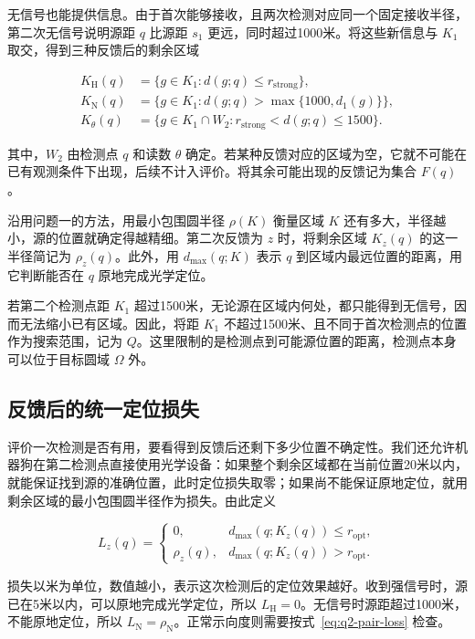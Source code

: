 无信号也能提供信息。由于首次能够接收，且两次检测对应同一个固定接收半径，第二次无信号说明源距 \(q\) 比源距 \(s_1\) 更远，同时超过1000米。将这些新信息与 \(K_1\) 取交，得到三种反馈后的剩余区域

\begin{equation}
\begin{aligned}
K_{\mathrm H}(q)&=\{g\in K_1:d(g;q)\le r_{\mathrm{strong}}\},\\
K_{\mathrm N}(q)&=\{g\in K_1:d(g;q)>\max\{1000,d_1(g)\}\},\\
K_\theta(q)&=\{g\in K_1\cap W_2:r_{\mathrm{strong}}<d(g;q)\le1500\}.
\end{aligned}
\label{eq:q2-pair-regions}
\end{equation}

其中，\(W_2\) 由检测点 \(q\) 和读数 \(\theta\) 确定。若某种反馈对应的区域为空，它就不可能在已有观测条件下出现，后续不计入评价。将其余可能出现的反馈记为集合 \(F(q)\)。

沿用问题一的方法，用最小包围圆半径 \(\rho(K)\) 衡量区域 \(K\) 还有多大，半径越小，源的位置就确定得越精细。第二次反馈为 \(z\) 时，将剩余区域 \(K_z(q)\) 的这一半径简记为 \(\rho_z(q)\)。此外，用 \(d_{\max}(q;K)\) 表示 \(q\) 到区域内最远位置的距离，用它判断能否在 \(q\) 原地完成光学定位。

若第二个检测点距 \(K_1\) 超过1500米，无论源在区域内何处，都只能得到无信号，因而无法缩小已有区域。因此，将距 \(K_1\) 不超过1500米、且不同于首次检测点的位置作为搜索范围，记为 \(Q\)。这里限制的是检测点到可能源位置的距离，检测点本身可以位于目标圆域 \(\Omega\) 外。

\subsection{反馈后的统一定位损失}

评价一次检测是否有用，要看得到反馈后还剩下多少位置不确定性。我们还允许机器狗在第二检测点直接使用光学设备：如果整个剩余区域都在当前位置20米以内，就能保证找到源的准确位置，此时定位损失取零；如果尚不能保证原地定位，就用剩余区域的最小包围圆半径作为损失。由此定义

\begin{equation}
 L_z(q)=
 \begin{cases}
 0,&d_{\max}(q;K_z(q))\le r_{\mathrm{opt}},\\
 \rho_z(q),&d_{\max}(q;K_z(q))>r_{\mathrm{opt}}.
 \end{cases}
\label{eq:q2-pair-loss}
\end{equation}

损失以米为单位，数值越小，表示这次检测后的定位效果越好。收到强信号时，源已在5米以内，可以原地完成光学定位，所以 \(L_{\mathrm H}=0\)。无信号时源距超过1000米，不能原地定位，所以 \(L_{\mathrm N}=\rho_{\mathrm N}\)。正常示向度则需要按式~\eqref{eq:q2-pair-loss} 检查。

